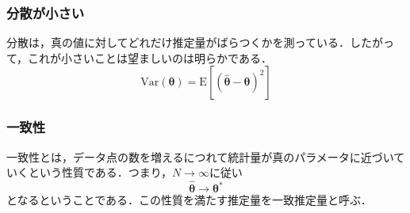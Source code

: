 \documentclass[a4paper,11pt]{jsreport}
\begin{document}
\subsubsection*{分散が小さい}
分散は，真の値に対してどれだけ推定量がばらつくかを測っている．したがって，これが小さいことは望ましいのは明らかである．
\begin{equation}
  \text{Var}\left( \bm{\theta} \right)
  = \mathrm{E} \left[ \left( \hat{\bm{\theta}} - \bm{\theta} \right)^2 \right]
\end{equation}

\subsubsection*{一致性}
一致性とは，データ点の数を増えるにつれて統計量が真のパラメータに近づいていくという性質である．つまり，$N \rightarrow \infty$に従い
\begin{equation}
  \hat{\bm{\theta}}
  \rightarrow \bm{\theta}^*
\end{equation}
となるということである．この性質を満たす推定量を一致推定量と呼ぶ．
\end{document}
